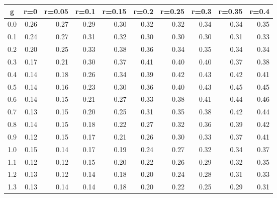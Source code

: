 %
\begin{table}[!tbp]
 \begin{center}
 \begin{tabular}{rrrrrrrrrr}\hline\hline
\multicolumn{1}{c}{g}&\multicolumn{1}{c}{r=0}&\multicolumn{1}{c}{r=0.05}&\multicolumn{1}{c}{r=0.1}&\multicolumn{1}{c}{r=0.15}&\multicolumn{1}{c}{r=0.2}&\multicolumn{1}{c}{r=0.25}&\multicolumn{1}{c}{r=0.3}&\multicolumn{1}{c}{r=0.35}&\multicolumn{1}{c}{r=0.4}\tabularnewline
\hline
0.0&0.26&0.27&0.29&0.30&0.32&0.32&0.34&0.34&0.35\tabularnewline
0.1&0.24&0.27&0.31&0.32&0.30&0.30&0.30&0.31&0.33\tabularnewline
0.2&0.20&0.25&0.33&0.38&0.36&0.34&0.35&0.34&0.34\tabularnewline
0.3&0.17&0.21&0.30&0.37&0.41&0.40&0.40&0.37&0.38\tabularnewline
0.4&0.14&0.18&0.26&0.34&0.39&0.42&0.43&0.42&0.41\tabularnewline
0.5&0.14&0.16&0.23&0.30&0.36&0.40&0.43&0.45&0.45\tabularnewline
0.6&0.14&0.15&0.21&0.27&0.33&0.38&0.41&0.44&0.46\tabularnewline
0.7&0.13&0.15&0.20&0.25&0.31&0.35&0.38&0.42&0.44\tabularnewline
0.8&0.14&0.15&0.18&0.22&0.27&0.32&0.36&0.39&0.42\tabularnewline
0.9&0.12&0.15&0.17&0.21&0.26&0.30&0.33&0.37&0.41\tabularnewline
1.0&0.15&0.14&0.17&0.19&0.24&0.27&0.32&0.34&0.37\tabularnewline
1.1&0.12&0.12&0.15&0.20&0.22&0.26&0.29&0.32&0.35\tabularnewline
1.2&0.13&0.12&0.14&0.18&0.20&0.24&0.28&0.31&0.33\tabularnewline
1.3&0.13&0.14&0.14&0.18&0.20&0.22&0.25&0.29&0.31\tabularnewline
\hline
\end{tabular}

\end{center}

\end{table}

